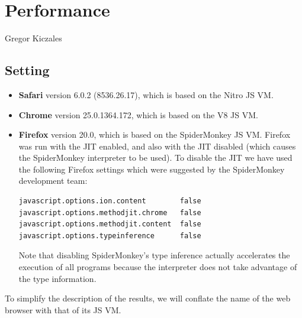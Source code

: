 \chapter{Performance}
\label{chap:Performance}

{Gregor Kiczales~\cite{Kiczales92towardsa}}


\section{Setting}

\begin{itemize}

\item
{\bf Safari} version 6.0.2 (8536.26.17), which is based on the Nitro JS VM.

\item
{\bf Chrome} version 25.0.1364.172, which is based on the V8 JS VM.

\item
{\bf Firefox} version 20.0, which is based on the SpiderMonkey
JS VM.  Firefox was run with the JIT enabled, and also with
the JIT disabled (which causes the SpiderMonkey interpreter to be
used).  To disable the JIT we have used the following Firefox settings
which were suggested by the SpiderMonkey development team:

{\small
\begin{verbatim}
javascript.options.ion.content        false
javascript.options.methodjit.chrome   false 
javascript.options.methodjit.content  false
javascript.options.typeinference      false
\end{verbatim}
}

Note that disabling SpiderMonkey's type inference actually
accelerates the execution of all programs because the interpreter does
not take advantage of the type information.

\end{itemize}

To simplify the description of the results, we will conflate the name of
the web browser with that of its JS VM.

